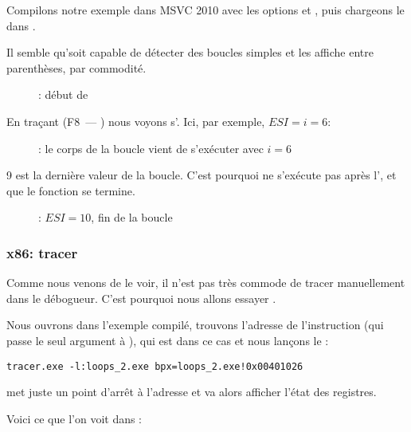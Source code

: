 Compilons notre exemple dans MSVC 2010 avec les options \Ox et \Obzero, puis chargeons
le dans \olly.

Il semble qu'\olly soit capable de détecter des boucles simples et les affiche entre
parenthèses, par commodité.

\begin{figure}[H]
\centering
{}
\caption{\olly: début de \main}
\label{fig:loops_olly_1}
\end{figure}

En traçant (F8~--- \stepover) nous voyons \ESI 
s'.
Ici, par exemple, $ESI=i=6$:

\begin{figure}[H]
\centering
{}
\caption{\olly: le corps de la boucle vient de s'exécuter avec $i=6$}
\label{fig:loops_olly_2}
\end{figure}

9 est la dernière valeur de la boucle.
C'est pourquoi \JL ne s'exécute pas après l',
et que le fonction se termine.

\begin{figure}[H]
\centering
{}
\caption{\olly: $ESI=10$, fin de la boucle}
\label{fig:loops_olly_3}
\end{figure}

\subsubsection{x86: tracer}

Comme nous venons de le voir, il n'est pas très commode de tracer manuellement dans
le débogueur.
C'est pourquoi nous allons essayer \tracer.

Nous ouvrons dans \IDA l'exemple compilé, trouvons l'adresse de l'instruction 
(qui passe le seul argument à \ttf), qui est  dans ce cas et nous lançons
le \tracer:

\begin{lstlisting}
tracer.exe -l:loops_2.exe bpx=loops_2.exe!0x00401026
\end{lstlisting}

 met juste un point d'arrêt à l'adresse et \tracer va alors afficher l'état
des registres.

Voici ce que l'on voit dans :

